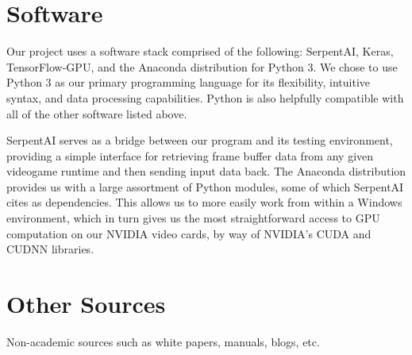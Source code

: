\section{Software}

Our project uses a software stack comprised of the following: SerpentAI, Keras, TensorFlow-GPU, and the Anaconda distribution for Python 3. We chose to use Python 3 as our primary programming language for its flexibility, intuitive syntax, and data processing capabilities. Python is also helpfully compatible with all of the other software listed above.

SerpentAI serves as a bridge between our program and its testing environment, providing a simple interface for retrieving frame buffer data from any given videogame runtime and then sending input data back. The Anaconda distribution provides us with a large assortment of Python modules, some of which SerpentAI cites as dependencies. This allows us to more easily work from within a Windows environment, which in turn gives us the most straightforward access to GPU computation on our NVIDIA video cards, by way of NVIDIA's CUDA and CUDNN libraries.




\section{Other Sources}

Non-academic sources such as white papers, manuals, blogs, etc.

